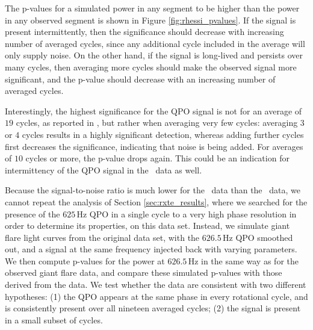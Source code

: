 \documentclass{emulateapj}
\begin{document}
The p-values for a simulated power in any segment to be higher than the power in any observed segment is shown in Figure \ref{fig:rhessi_pvalues}. If the signal is present intermittently, then the significance should decrease with increasing number of averaged cycles, since any additional cycle included in the average will only supply noise. On the other hand, if the signal is long-lived and persists over many cycles, then averaging more cycles should make the observed signal more significant, and the p-value should decrease with an increasing number of averaged cycles.

Interestingly, the highest significance for the QPO signal is not for an average of $19$ cycles, as reported in \citet{Watts06}, but rather when averaging very few cycles: averaging $3$ or $4$ cycles results in a highly significant detection, whereas adding further cycles first decreases the significance, indicating that noise is being added. For averages of $10$ cycles or more, the p-value drops again. This could be an indication for intermittency of the QPO signal in the \rhessi\ data as well.

Because the signal-to-noise ratio is much lower for the \rhessi\ data than the \rxte\ data, we cannot repeat the analysis of Section \ref{sec:rxte_results}, where we searched for the presence of the $625 \, \mathrm{Hz}$ QPO in a single cycle to a very high phase resolution in order to determine its properties, on this data set. Instead, we simulate giant flare light curves from the original data set, with the $626.5 \, \mathrm{Hz}$ QPO smoothed out, and a signal at the same frequency injected back with varying parameters. We then compute p-values for the power at $626.5 \, \mathrm{Hz}$ in the same way as for the observed giant flare data, and compare these simulated p-values with those derived from the data. We test whether the data are consistent with two different hypotheses: (1) the QPO appears at the same phase in every rotational cycle, and is consistently present over all nineteen averaged cycles; (2) the signal is present in a small subset of cycles.
\end{document}
